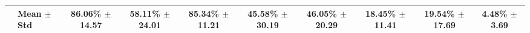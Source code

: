 \begin{table}[t]
{\begin{tabular}{ll*{8}{c}}
\midrule
 & \textbf{Mean $\pm$ Std} & 86.06\% $\pm$ 14.57 & 58.11\% $\pm$ 24.01 & 85.34\% $\pm$ 11.21 & 45.58\% $\pm$ 30.19 & 46.05\% $\pm$ 20.29 & 18.45\% $\pm$ 11.41 & 19.54\% $\pm$ 17.69 & 4.48\% $\pm$ 3.69 \\
\bottomrule
\end{tabular}
}
\end{table}
